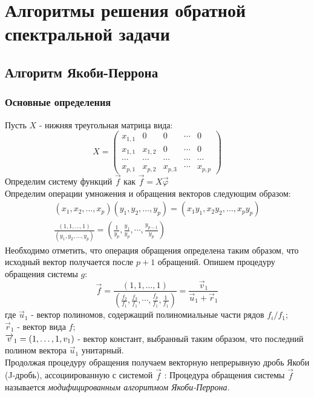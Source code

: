 \section{Алгоритмы решения обратной спектральной задачи}
\subsection{Алгоритм Якоби-Перрона}
\subsubsection{Основные определения}
Пусть $X$ - нижняя треугольная матрица вида:
$$%
X=\left(
\begin{array} {cccccc}
x_{1,1} & 0       & 0       & \cdots & 0\\
x_{1,1} & x_{1,2} & 0       & \cdots & 0\\
\cdots  & \cdots  & \cdots  & \cdots & \cdots\\
x_{p,1} & x_{p,2} & x_{p,3} & \cdots & x_{p,p}
\end{array}
\right)
$$%
Определим систему функций $\overrightarrow{f}$ как
$\overrightarrow{f}=X\overrightarrow{\varphi}$ \\
Определим операции умножения и обращения векторов следующим
образом:
\begin{eqnarray}
(x_1,x_2,\ldots,x_p)(y_1,y_2,\ldots,y_p)=(x_1y_1,x_2y_2,\ldots,x_py_p)\nonumber\\
\frac{(1,1,\ldots,1)}{(y_1,y_2,\ldots,y_p)}= \left(
\frac{1}{y_p},\frac{y_1}{y_p},\cdots,\frac{y_{p-1}}{y_p}
\right)\nonumber
\end{eqnarray}
Необходимо отметить, что операция обращения определена таким
образом, что исходный вектор получается после $p+1$ обращений.
Опишем процедуру обращения системы $g$:
$$%
\overrightarrow{f}= \frac{(1,1,\ldots,1)} { \left( \displaystyle{
\frac{f_2}{f_1},\frac{f_3}{f_1},\cdots,\frac{f_p}{f_1},\frac{1}{f_1}
} \right) } = \frac{\overrightarrow{v}_1}
{\overrightarrow{u}_1+\overrightarrow{r}_1}
$$%
где $\overrightarrow{u}_1$ - вектор полиномов, содержащий полиномиальные части рядов ${f_i/f_1}$;\\
$\overrightarrow{r}_1$ - вектор вида $f$;\\
$\overrightarrow{v}_1=(1,\ldots,1, v_1) \rm$ - вектор констант,
выбранный таким образом, что
последний полином вектора $\overrightarrow{u}_1$ унитарный.\\
Продолжая процедуру обращения получаем векторную непрерывную дробь
Якоби (J-дробь), ассоциированную с системой $\overrightarrow{f}$ :
Процедура обращения системы $\overrightarrow{f}$ называется \emph{модифицированным алгоритмом Якоби-Перрона.}
